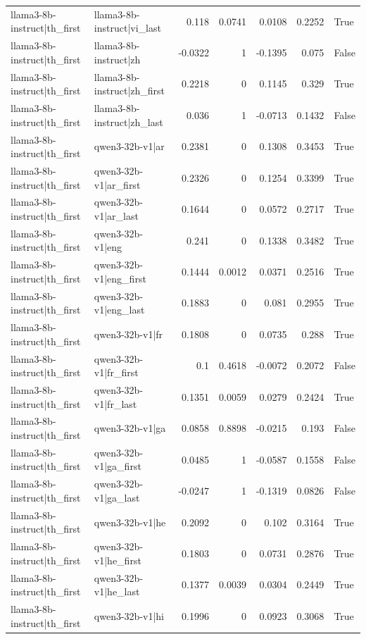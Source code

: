 \begin{table}
\begin{tabular}{l l r r r r l}
llama3-8b-instruct|th_first & llama3-8b-instruct|vi_last & 0.118 & 0.0741 & 0.0108 & 0.2252 & True \\
llama3-8b-instruct|th_first & llama3-8b-instruct|zh & -0.0322 & 1 & -0.1395 & 0.075 & False \\
llama3-8b-instruct|th_first & llama3-8b-instruct|zh_first & 0.2218 & 0 & 0.1145 & 0.329 & True \\
llama3-8b-instruct|th_first & llama3-8b-instruct|zh_last & 0.036 & 1 & -0.0713 & 0.1432 & False \\
llama3-8b-instruct|th_first & qwen3-32b-v1|ar & 0.2381 & 0 & 0.1308 & 0.3453 & True \\
llama3-8b-instruct|th_first & qwen3-32b-v1|ar_first & 0.2326 & 0 & 0.1254 & 0.3399 & True \\
llama3-8b-instruct|th_first & qwen3-32b-v1|ar_last & 0.1644 & 0 & 0.0572 & 0.2717 & True \\
llama3-8b-instruct|th_first & qwen3-32b-v1|eng & 0.241 & 0 & 0.1338 & 0.3482 & True \\
llama3-8b-instruct|th_first & qwen3-32b-v1|eng_first & 0.1444 & 0.0012 & 0.0371 & 0.2516 & True \\
llama3-8b-instruct|th_first & qwen3-32b-v1|eng_last & 0.1883 & 0 & 0.081 & 0.2955 & True \\
llama3-8b-instruct|th_first & qwen3-32b-v1|fr & 0.1808 & 0 & 0.0735 & 0.288 & True \\
llama3-8b-instruct|th_first & qwen3-32b-v1|fr_first & 0.1 & 0.4618 & -0.0072 & 0.2072 & False \\
llama3-8b-instruct|th_first & qwen3-32b-v1|fr_last & 0.1351 & 0.0059 & 0.0279 & 0.2424 & True \\
llama3-8b-instruct|th_first & qwen3-32b-v1|ga & 0.0858 & 0.8898 & -0.0215 & 0.193 & False \\
llama3-8b-instruct|th_first & qwen3-32b-v1|ga_first & 0.0485 & 1 & -0.0587 & 0.1558 & False \\
llama3-8b-instruct|th_first & qwen3-32b-v1|ga_last & -0.0247 & 1 & -0.1319 & 0.0826 & False \\
llama3-8b-instruct|th_first & qwen3-32b-v1|he & 0.2092 & 0 & 0.102 & 0.3164 & True \\
llama3-8b-instruct|th_first & qwen3-32b-v1|he_first & 0.1803 & 0 & 0.0731 & 0.2876 & True \\
llama3-8b-instruct|th_first & qwen3-32b-v1|he_last & 0.1377 & 0.0039 & 0.0304 & 0.2449 & True \\
llama3-8b-instruct|th_first & qwen3-32b-v1|hi & 0.1996 & 0 & 0.0923 & 0.3068 & True \\

\end{tabular}
\end{table}
